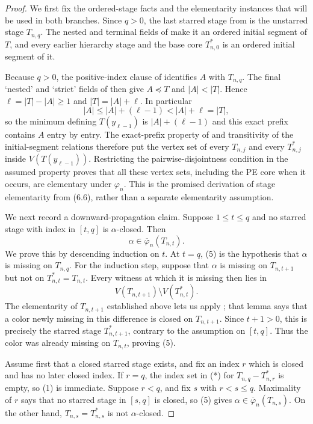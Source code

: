 \begin{proof}
We first fix the ordered-stage facts and the elementarity instances that
will be used in both branches.  Since $q>0$, the last starred stage from
 is the unstarred stage $T_{n,q}$.
The nested and terminal fields of  make it
an ordered initial segment of $T$, and every earlier hierarchy stage and
the base core $T_{n,0}^{*}$ is an ordered initial segment of it.

Because $q>0$, the positive-index clause of
 identifies $A$ with $T_{n,q}$.  The
final `nested' and `strict' fields of  then
give $A\preccurlyeq T$ and $|A|<|T|$.  Hence
$\ell=|T|-|A|\geq1$ and $|T|=|A|+\ell$.  In particular
\[
 |A|\leq |A|+(\ell-1)<|A|+\ell=|T|,
\]
so the minimum defining $T(y_{\ell-1})$ is
$|A|+(\ell-1)$ and this exact prefix contains $A$ entry by entry.  The
exact-prefix property of  and transitivity
of the initial-segment relations therefore put the vertex set of every
$T_{n,j}$ and every $T_{n,j}^{*}$ inside
$V(T(y_{\ell-1}))$.  Restricting the pairwise-disjointness condition in the
assumed  property proves that all
these vertex sets, including the PE core when it occurs, are elementary
under $\varphi_n$.  This is the promised derivation of stage
elementarity from (6.6), rather than a separate elementarity assumption.

We next record a downward-propagation claim.  Suppose
$1\leq t\leq q$ and no starred stage with index in $[t,q]$ is
$\alpha$-closed.  Then
\[
                    \alpha\in\overline\varphi_n(T_{n,t}).      \tag{5}
\]
We prove this by descending induction on $t$.  At $t=q$, (5) is the
hypothesis that $\alpha$ is missing on $T_{n,q}$.  For the induction
step, suppose that $\alpha$ is missing on $T_{n,t+1}$ but not on
$T_{n,t}^{*}=T_{n,t}$.  Every witness at which it is missing then lies
in
\[
             V(T_{n,t+1})\setminus V(T_{n,t}^{*}).
\]
The elementarity of $T_{n,t+1}$ established above lets us apply
; that lemma says that a color
newly missing in this difference is closed on $T_{n,t+1}$.  Since
$t+1>0$, this is precisely the starred stage
$T_{n,t+1}^{*}$, contrary to the assumption on $[t,q]$.  Thus the color
was already missing on $T_{n,t}$, proving (5).

Assume first that a closed starred stage exists, and fix an index $r$
which is closed and has no later closed index.  If $r=q$, the index set
in (*) for $T_{n,q}-T_{n,r}^{*}$ is empty, so (1) is immediate.  Suppose
$r<q$, and fix $s$ with $r<s\leq q$.  Maximality of $r$ says that no
starred stage in $[s,q]$ is closed, so (5) gives
$\alpha\in\overline\varphi_n(T_{n,s})$.  On the other hand,
$T_{n,s}=T_{n,s}^{*}$ is not $\alpha$-closed.


\end{proof}
